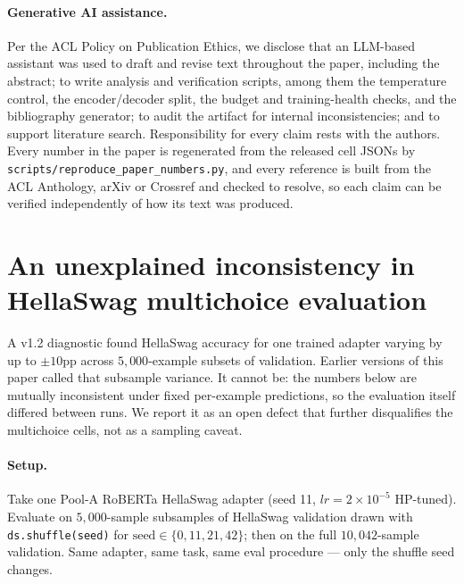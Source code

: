 \documentclass[11pt]{article}
\begin{document}
\paragraph{Generative AI assistance.} Per the ACL Policy on Publication Ethics, we disclose that an LLM-based assistant was used to draft and revise text throughout the paper, including the abstract; to write analysis and verification scripts, among them the temperature control, the encoder/decoder split, the budget and training-health checks, and the bibliography generator; to audit the artifact for internal inconsistencies; and to support literature search. Responsibility for every claim rests with the authors. Every number in the paper is regenerated from the released cell JSONs by \texttt{scripts/\allowbreak reproduce\_\allowbreak paper\_\allowbreak numbers.\allowbreak py}, and every reference is built from the ACL Anthology, arXiv or Crossref and checked to resolve, so each claim can be verified independently of how its text was produced.



\appendix
\makeatletter
\renewcommand\thesection{%
  \ifnum\value{section}>26 A\@Alph{\numexpr\value{section}-26\relax}%
  \else\@Alph\c@section\fi}
\makeatother
\sloppy

\section{An unexplained inconsistency in HellaSwag multichoice evaluation}\label{app:splitvar}

A v1.2 diagnostic found HellaSwag accuracy for one trained adapter varying by up to $\pm 10$pp across $5{,}000$-example subsets of validation. Earlier versions of this paper called that subsample variance. It cannot be: the numbers below are mutually inconsistent under fixed per-example predictions, so the evaluation itself differed between runs. We report it as an open defect that further disqualifies the multichoice cells, not as a sampling caveat.

\paragraph{Setup.} Take one Pool-A RoBERTa HellaSwag adapter (seed 11, $lr{=}2{\times}10^{-5}$ HP-tuned). Evaluate on $5{,}000$-sample subsamples of HellaSwag validation drawn with \texttt{ds.\allowbreak shuffle(seed)} for $\text{seed}\!\in\!\{0, 11, 21, 42\}$; then on the full $10{,}042$-sample validation. Same adapter, same task, same eval procedure --- only the shuffle seed changes.
\end{document}
